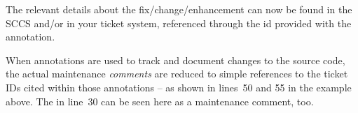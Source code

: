 The relevant details about the fix/change/enhancement can now be found in the SCCS and/or in your ticket system, referenced through the id provided with the annotation.

When annotations are used to track and document changes to the source code, the actual maintenance \textit{comments} are reduced to simple references to the ticket IDs cited within those annotations – as shown in lines~50 and 55 in the example above. The  in line~30 can be seen here as a maintenance comment, too.


